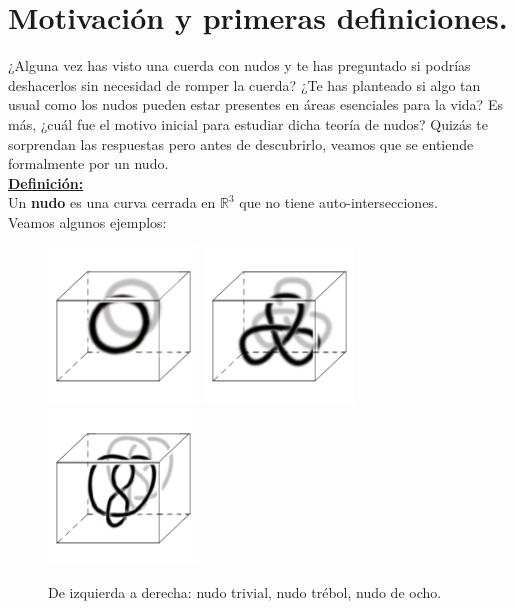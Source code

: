 \section{Motivación y primeras definiciones.}
  ¿Alguna vez has visto una cuerda con nudos y te has preguntado si podrías deshacerlos sin necesidad de romper la cuerda? ¿Te has planteado si algo tan usual como los nudos pueden estar presentes en áreas esenciales para la vida? Es más, ¿cuál fue el motivo inicial para estudiar dicha teoría de nudos? Quizás te sorprendan las respuestas pero antes de descubrirlo, veamos que se entiende formalmente por un nudo.\\
  
\underline{\textbf{Definición:}}\\
 Un \textbf{nudo} es una curva cerrada en $\mathds{R}^{3}$ que no tiene auto-intersecciones.\\
Veamos algunos ejemplos:

  \begin{figure}[h!]
  	\includegraphics[width=4cm]{inudos/cubo1.png}
  	\includegraphics[width=4cm]{inudos/cubo2.png} 
  	\includegraphics[width=4cm]{inudos/cubo3.png}
  	\centering
  	\caption{De izquierda a derecha: nudo trivial, nudo trébol, nudo de ocho.}
  	\label{trid} 
  \end{figure}

